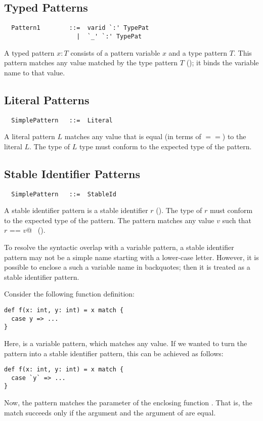 \subsection{Typed Patterns}

\syntax
\begin{lstlisting}
  Pattern1        ::=  varid `:' TypePat
                    |  `_' `:' TypePat
\end{lstlisting}

A typed pattern $x: T$ consists of a pattern variable $x$ and a
type pattern $T$.  This pattern matches any value matched by the type
pattern $T$ (); it binds the variable name to
that value.

\subsection{Literal Patterns}

\syntax\begin{lstlisting}
  SimplePattern   ::=  Literal
\end{lstlisting}

A literal pattern $L$ matches any value that is equal (in terms of
$==$) to the literal $L$. The type of $L$ type must conform to the
expected type of the pattern.

\subsection{Stable Identifier Patterns} 

\syntax
\begin{lstlisting}
  SimplePattern   ::=  StableId
\end{lstlisting}

A stable identifier pattern is a stable identifier $r$
(). The type of $r$ must conform to the expected
type of the pattern. The pattern matches any value $v$ such that
~\lstinline@$r$ == $v$@~ ().

To resolve the syntactic overlap with a variable pattern, a
stable identifier pattern may not be a simple name starting with a lower-case
letter. However, it is possible to enclose a such a variable name in
backquotes; then it is treated as a stable identifier pattern.

\example Consider the following function definition:
\begin{lstlisting}
def f(x: int, y: int) = x match {
  case y => ...
}
\end{lstlisting}
Here, \lstinline@y@ is a variable pattern, which matches any value.
If we wanted to turn the pattern into a stable identifier pattern, this
can be achieved as follows:
\begin{lstlisting}
def f(x: int, y: int) = x match {
  case `y` => ...
}
\end{lstlisting}
Now, the pattern matches the  parameter of the enclosing function .
That is, the match succeeds only if the  argument and the 
argument of  are equal.

